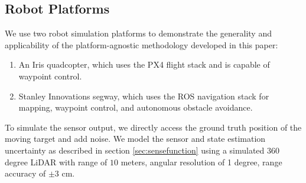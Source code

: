 








\subsection{Robot Platforms}

We use two robot simulation platforms to demonstrate the generality and applicability of the platform-agnostic methodology developed in this paper:
\begin{enumerate}
    \item An Iris quadcopter, which uses the PX4 flight stack and is capable of waypoint control.
    \item Stanley Innovations segway, which uses the ROS navigation stack for mapping, waypoint control, and autonomous obstacle avoidance. 
\end{enumerate}
To simulate the sensor output, we directly access the ground truth position of the moving target and add noise. We model the sensor and state estimation uncertainty as described in section \ref{sec:sensefunction} using a simulated 360 degree LiDAR with range of  $10$ meters, angular resolution of 1 degree, range accuracy of $\pm 3$ cm.


